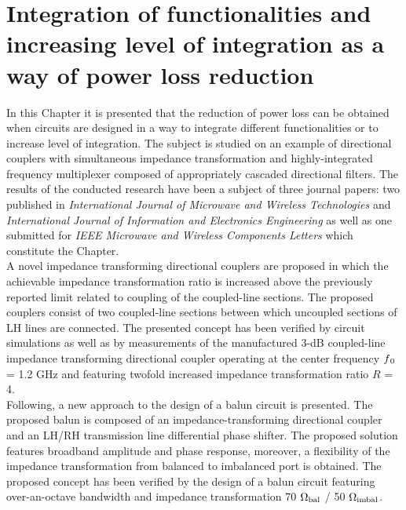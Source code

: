 \chapter{Integration of functionalities and increasing level of integration as a way of power loss reduction}\label{chap6}

\indent In this Chapter it is presented that the reduction of power loss can be obtained when circuits are designed in a way to integrate different functionalities or to increase level of integration. The subject is studied on an example of directional couplers with simultaneous impedance transformation and highly-integrated frequency multiplexer composed of appropriately cascaded directional filters. The results of the conducted research have been a subject of three journal papers: two published in \textit{International Journal of Microwave and Wireless Technologies} and \textit{International Journal of Information and Electronics Engineering} as well as one submitted for \textit{IEEE Microwave and Wireless Components Letters} which constitute the Chapter.
\\
\indent A novel impedance transforming directional couplers are proposed in which the achievable impedance transformation ratio is increased above the previously reported limit related to coupling of the coupled-line sections. The proposed couplers consist of two coupled-line sections between which uncoupled sections of LH lines are connected. The presented concept has been verified by circuit simulations as well as by measurements of the manufactured 3-dB coupled-line impedance transforming directional coupler operating at the center frequency $f\textsubscript{0}$ = 1.2 GHz and featuring twofold increased impedance transformation ratio $R$ = 4.
\\
\indent Following, a new approach to the design of a balun circuit is presented. The proposed balun is composed of an impedance-transforming directional coupler and an LH/RH transmission line differential phase shifter. The proposed solution features broadband amplitude and phase response, moreover, a flexibility of the impedance transformation from balanced to imbalanced port is obtained. The proposed concept has been verified by the design of a balun circuit featuring over-an-octave bandwidth and impedance transformation 70 $\Omega \textsubscript{bal}$ / 50 $\Omega \textsubscript{imbal}$.
\\

